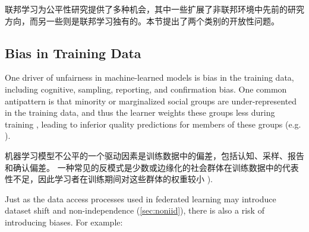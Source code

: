 联邦学习为公平性研究提供了多种机会，其中一些扩展了非联邦环境中先前的研究方向，而另一些则是联邦学习独有的。本节提出了两个类别的开放性问题。
\subsection{Bias in Training Data}\label{subsec:bias-in-training-data}

One driver of unfairness in machine-learned models is bias in the training data, including cognitive, sampling, reporting, and confirmation bias. One common antipattern is that minority or marginalized social groups are under-represented in the training data, and thus the learner weights these groups less during training \cite{kamishima2011fairness}, leading to inferior quality predictions for members of these groups (e.g. \cite{buolamwini2018gender}).

机器学习模型不公平的一个驱动因素是训练数据中的偏差，包括认知、采样、报告和确认偏差。 一种常见的反模式是少数或边缘化的社会群体在训练数据中的代表性不足，因此学习者在训练期间对这些群体的权重较小  \cite{buolamwini2018gender}).

Just as the data access processes used in federated learning may introduce dataset shift and non-independence (\cref{sec:noniid}), there is also a risk of introducing biases. For example:

